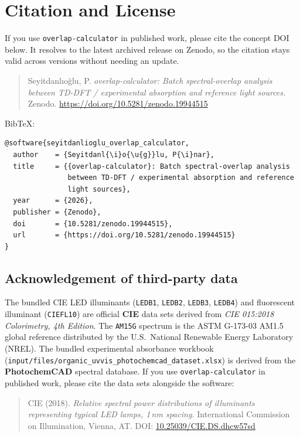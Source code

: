 \documentclass[11pt,a4paper]{article}
\begin{document}
\section{Citation and License}
\label{sec:citation}

If you use \texttt{overlap-calculator} in published work, please
cite the concept DOI below. It resolves to the latest archived
release on Zenodo, so the citation stays valid across versions
without needing an update.

\begin{quote}
Seyitdanl{\i}o{\u{g}}lu, P. \emph{overlap-calculator: Batch
spectral-overlap analysis between TD-DFT / experimental absorption and
reference light sources.} Zenodo.
\url{https://doi.org/10.5281/zenodo.19944515}
\end{quote}

BibTeX:
\begin{lstlisting}
@software{seyitdanlioglu_overlap_calculator,
  author    = {Seyitdanl{\i}o{\u{g}}lu, P{\i}nar},
  title     = {{overlap-calculator}: Batch spectral-overlap analysis
               between TD-DFT / experimental absorption and reference
               light sources},
  year      = {2026},
  publisher = {Zenodo},
  doi       = {10.5281/zenodo.19944515},
  url       = {https://doi.org/10.5281/zenodo.19944515}
}
\end{lstlisting}

\subsection*{Acknowledgement of third-party data}

The bundled CIE LED illuminants (\texttt{LEDB1}, \texttt{LEDB2},
\texttt{LEDB3}, \texttt{LEDB4}) and fluorescent illuminant
(\texttt{CIEFL10}) are official \textbf{CIE} data sets derived from
\emph{CIE 015:2018 Colorimetry, 4th Edition}. The \texttt{AM15G}
spectrum is the ASTM G-173-03 AM1.5 global reference distributed by
the U.S.\ National Renewable Energy Laboratory (NREL). The bundled
experimental absorbance workbook
(\texttt{input/files/organic\_uvvis\_photochemcad\_dataset.xlsx}) is
derived from the \textbf{PhotochemCAD} spectral database. If you use
\texttt{overlap-calculator} in published work, please cite the data
sets alongside the software:

\begin{quote}
CIE (2018). \emph{Relative spectral power distributions of
illuminants representing typical LED lamps, 1\,nm spacing.}
International Commission on Illumination, Vienna, AT.
DOI: \href{https://doi.org/10.25039/CIE.DS.dhcw57sd}{10.25039/CIE.DS.dhcw57sd}
\end{quote}
\end{document}
